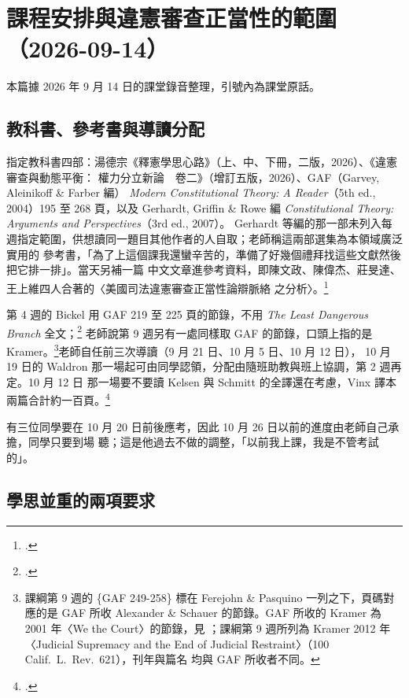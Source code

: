 \chapter{課程安排與違憲審查正當性的範圍（2026-09-14）}

本篇據 2026 年 9 月 14 日的課堂錄音整理，引號內為課堂原話。

\section{教科書、參考書與導讀分配}

指定教科書四部：湯德宗《釋憲學思心路》（上、中、下冊，二版，2026）、《違憲審查與動態平衡：
權力分立新論　卷二》（增訂五版，2026）、GAF（Garvey, Aleinikoff \& Farber 編）
\emph{Modern Constitutional Theory: A Reader}（5th ed., 2004）195 至 268 頁，以及
Gerhardt, Griffin \& Rowe 編 \emph{Constitutional Theory: Arguments and Perspectives}（3rd ed., 2007）。
Gerhardt 等編的那一部未列入每週指定範圍，供想讀同一題目其他作者的人自取；老師稱這兩部選集為本領域廣泛實用的
參考書，「為了上這個課我還蠻辛苦的，準備了好幾個禮拜找這些文獻然後把它排一排」。當天另補一篇
中文文章進參考資料，即陳文政、陳偉杰、莊旻達、王上維四人合著的〈美國司法違憲審查正當性論辯脈絡
之分析〉。\footcite{chen2011}

第 4 週的 Bickel 用 GAF 219 至 225 頁的節錄，不用 \emph{The Least Dangerous Branch} 全文；\footcite{bickel2004}
老師說第 9 週另有一處同樣取 GAF 的節錄，口頭上指的是 Kramer。\footnote{課綱第 9 週的 \{GAF 249-258\}
標在 Ferejohn \& Pasquino 一列之下，頁碼對應的是 GAF 所收 Alexander \& Schauer 的節錄。GAF 所收的
Kramer 為 2001 年〈We the Court〉的節錄，見 \cite{kramer2001gaf}；課綱第 9 週所列為 Kramer 2012 年
〈Judicial Supremacy and the End of Judicial Restraint〉（100 Calif.\ L.\ Rev.\ 621），刊年與篇名
均與 GAF 所收者不同。}老師自任前三次導讀（9 月 21 日、10 月 5 日、10 月 12 日），
10 月 19 日的 Waldron 那一場起可由同學認領，分配由隨班助教與班上協調，第 2 週再定。10 月 12 日
那一場要不要讀 Kelsen 與 Schmitt 的全譯還在考慮，Vinx 譯本兩篇合計約一百頁。\footcites[22--78]{kelsen2015}[79--124]{schmitt2015}

有三位同學要在 10 月 20 日前後應考，因此 10 月 26 日以前的進度由老師自己承擔，同學只要到場
聽；這是他過去不做的調整，「以前我上課，我是不管考試的」。

\section{學思並重的兩項要求}

